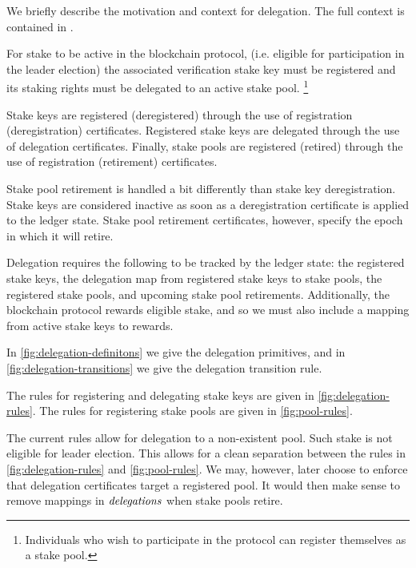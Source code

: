 We briefly describe the motivation and context for delegation.
The full context is contained in \cite{delegation_design}.

For stake to be active in the blockchain protocol,
(i.e. eligible for participation in the leader election)
the associated verification stake key must be registered
and its staking rights must be delegated to an active stake pool.
\footnote{Individuals who wish to participate in the protocol can
register themselves as a stake pool.}

Stake keys are registered (deregistered) through the use of
registration (deregistration) certificates.
Registered stake keys are delegated through the use of delegation certificates.
Finally, stake pools are registered (retired) through the use of
registration (retirement) certificates.

Stake pool retirement is handled a bit differently than stake key deregistration.
Stake keys are considered inactive as soon as a deregistration certificate
is applied to the ledger state.
Stake pool retirement certificates, however, specify the epoch in
which it will retire.

Delegation requires the following to be tracked by the ledger state:
the registered stake keys, the delegation map from registered stake keys to stake
pools, the registered stake pools, and upcoming stake pool retirements.
Additionally, the blockchain protocol rewards eligible stake, and so we must
also include a mapping from active stake keys to rewards.

In \cref{fig:delegation-definitons} we give the delegation primitives,
and in \cref{fig:delegation-transitions} we give the delegation transition rule.

The rules for registering and delegating stake keys are given in \cref{fig:delegation-rules}.
The rules for registering stake pools are given in \cref{fig:pool-rules}.

\begin{note}
  The current rules allow for delegation to a non-existent pool.
  Such stake is not eligible for leader election.
  This allows for a clean separation between the rules in
  \cref{fig:delegation-rules} and \cref{fig:pool-rules}.
  We may, however, later choose to enforce that delegation certificates
  target a registered pool. It would then make sense to remove
  mappings in $\mathit{delegations}$ when stake pools retire.
\end{note}


